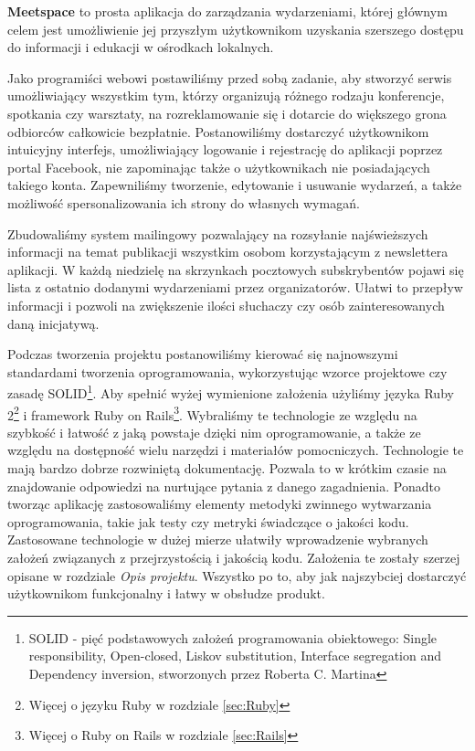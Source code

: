 \textbf{Meetspace} to prosta aplikacja do zarządzania wydarzeniami, której głównym celem jest umożliwienie jej przyszłym użytkownikom uzyskania szerszego dostępu do informacji i edukacji w ośrodkach lokalnych.


Jako programiści webowi postawiliśmy przed sobą zadanie, aby stworzyć serwis umożliwiający wszystkim tym, którzy organizują różnego rodzaju konferencje, spotkania czy warsztaty, na rozreklamowanie się i dotarcie do większego grona odbiorców całkowicie bezpłatnie.
Postanowiliśmy dostarczyć użytkownikom intuicyjny interfejs, umożliwiający logowanie i rejestrację do aplikacji poprzez portal Facebook, nie zapominając także o użytkownikach nie posiadających takiego konta. Zapewniliśmy tworzenie, edytowanie i usuwanie wydarzeń, a także
możliwość spersonalizowania ich strony do własnych wymagań.


Zbudowaliśmy system mailingowy pozwalający na rozsyłanie najświeższych informacji na temat publikacji wszystkim osobom korzystającym z newslettera aplikacji. W każdą niedzielę na skrzynkach pocztowych subskrybentów pojawi się lista z ostatnio dodanymi wydarzeniami przez organizatorów. Ułatwi to przepływ informacji i pozwoli na zwiększenie ilości słuchaczy czy osób zainteresowanych daną inicjatywą.

Podczas tworzenia projektu postanowiliśmy kierować się najnowszymi standardami tworzenia oprogramowania, wykorzystując wzorce projektowe czy zasadę SOLID\footnote{SOLID - pięć podstawowych założeń programowania obiektowego: Single responsibility, Open-closed, Liskov substitution, Interface segregation and Dependency inversion, stworzonych przez Roberta C. Martina}. Aby spełnić wyżej wymienione założenia użyliśmy języka  Ruby 2\footnote{Więcej o języku Ruby w rozdziale \ref{sec:Ruby}} i framework  Ruby on Rails\footnote{Więcej o Ruby on Rails w rozdziale \ref{sec:Rails}}. Wybraliśmy te technologie ze względu na szybkość i łatwość z jaką powstaje dzięki nim oprogramowanie, a także ze względu na dostępność wielu narzędzi i materiałów pomocniczych. Technologie te mają bardzo dobrze rozwiniętą dokumentację. Pozwala to w krótkim czasie na znajdowanie odpowiedzi na nurtujące pytania z danego zagadnienia. Ponadto tworząc aplikację zastosowaliśmy elementy metodyki zwinnego wytwarzania oprogramowania, takie jak testy czy metryki świadczące o jakości kodu. Zastosowane technologie w dużej mierze ułatwiły wprowadzenie wybranych założeń związanych z przejrzystością i jakością kodu. Założenia te zostały szerzej opisane w rozdziale \emph{Opis projektu}.
Wszystko po to, aby jak najszybciej dostarczyć użytkownikom funkcjonalny i łatwy w obsłudze produkt.
